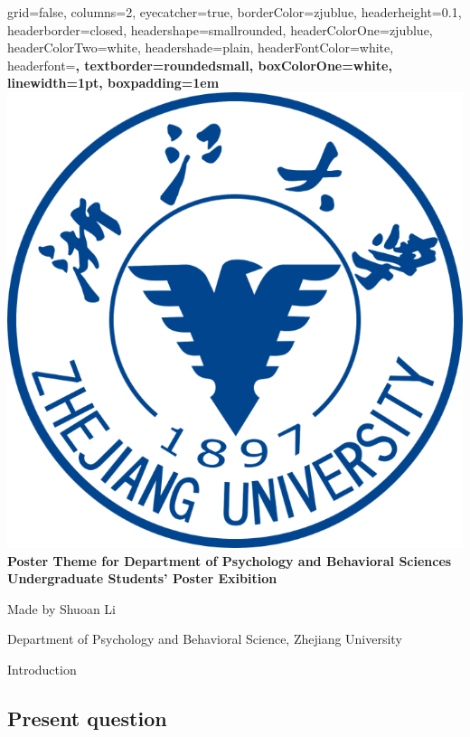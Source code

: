 \documentclass[a0paper,portrait]{xebaposter}
\begin{document}
\begin{poster}
  {
    grid=false,
    columns=2,
    eyecatcher=true,
    borderColor=zjublue,
    headerheight=0.1\textheight,
    headerborder=closed,
    headershape=smallrounded,
    headerColorOne=zjublue,
    headerColorTwo=white,
    headershade=plain,
    headerFontColor=white,
    headerfont=\large\bf\setmainfont{Impact},
    textborder=roundedsmall,
    boxColorOne=white,
    linewidth=1pt,
    boxpadding=1em
  }
  {
    \includegraphics[height=0.75\headerheight]{zju-logo.png}
  }
  {
    \color{zjublue}\bf\huge
    Poster Theme for Department of Psychology and Behavioral Sciences Undergraduate Students' Poster Exibition
  }
  {
    \color{zjublue}
    Made by Shuoan Li

    Department of Psychology and Behavioral Science, Zhejiang University
  }

  \begin{posterbox}[name=introduction,span=2,column=0,row=0]{Introduction}
    \begin{minipage}{.48\textwidth}
      \lipsum[1]

      \vspace{.01\textheight}
      \setlength{}
      \colorbox{zjugrey}{\parbox{.9\textwidth}{
        \section*{Present question}
        \lipsum[2]
        \vspace{.01\textheight}
      }}
    \end{minipage}\hspace{.02\textwidth}
    \begin{minipage}{.48\textwidth}
      \lipsum[3-4]
    \end{minipage}
  \end{posterbox}


\end{poster}
\end{document}

